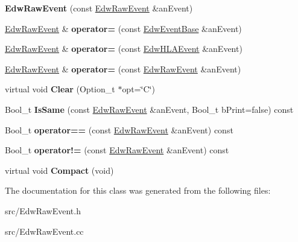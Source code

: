 \begin{DoxyCompactItemize}
\item 
\hypertarget{class_edw_raw_event_a6dc985ad21885b87dd63323aa3f976d9}{
{\bfseries EdwRawEvent} (const \hyperlink{class_edw_raw_event}{EdwRawEvent} \&anEvent)}
\label{class_edw_raw_event_a6dc985ad21885b87dd63323aa3f976d9}

\item 
\hypertarget{class_edw_raw_event_a9deee9051011719d5b54b9e8577bf076}{
\hyperlink{class_edw_raw_event}{EdwRawEvent} \& {\bfseries operator=} (const \hyperlink{class_edw_event_base}{EdwEventBase} \&anEvent)}
\label{class_edw_raw_event_a9deee9051011719d5b54b9e8577bf076}

\item 
\hypertarget{class_edw_raw_event_afc4b062e57612bb1a11b8c376416c143}{
\hyperlink{class_edw_raw_event}{EdwRawEvent} \& {\bfseries operator=} (const \hyperlink{class_edw_h_l_a_event}{EdwHLAEvent} \&anEvent)}
\label{class_edw_raw_event_afc4b062e57612bb1a11b8c376416c143}

\item 
\hypertarget{class_edw_raw_event_ac211cad9f007236a1f61ea7785884936}{
\hyperlink{class_edw_raw_event}{EdwRawEvent} \& {\bfseries operator=} (const \hyperlink{class_edw_raw_event}{EdwRawEvent} \&anEvent)}
\label{class_edw_raw_event_ac211cad9f007236a1f61ea7785884936}

\item 
\hypertarget{class_edw_raw_event_a67644a30d12355cf037f7ee13e271ea5}{
virtual void {\bfseries Clear} (Option\_\-t $\ast$opt=\char`\"{}C\char`\"{})}
\label{class_edw_raw_event_a67644a30d12355cf037f7ee13e271ea5}

\item 
\hypertarget{class_edw_raw_event_a1291b1ada8ad527048f8b13053507d54}{
Bool\_\-t {\bfseries IsSame} (const \hyperlink{class_edw_raw_event}{EdwRawEvent} \&anEvent, Bool\_\-t bPrint=false) const }
\label{class_edw_raw_event_a1291b1ada8ad527048f8b13053507d54}

\item 
\hypertarget{class_edw_raw_event_a22212a644931a9c28513ced326344d40}{
Bool\_\-t {\bfseries operator==} (const \hyperlink{class_edw_raw_event}{EdwRawEvent} \&anEvent) const }
\label{class_edw_raw_event_a22212a644931a9c28513ced326344d40}

\item 
\hypertarget{class_edw_raw_event_aa9385597e64e8c19e366043024458a0e}{
Bool\_\-t {\bfseries operator!=} (const \hyperlink{class_edw_raw_event}{EdwRawEvent} \&anEvent) const }
\label{class_edw_raw_event_aa9385597e64e8c19e366043024458a0e}

\item 
\hypertarget{class_edw_raw_event_ac52b4f653ec0a470adcb37bb469f84c0}{
virtual void {\bfseries Compact} (void)}
\label{class_edw_raw_event_ac52b4f653ec0a470adcb37bb469f84c0}

\end{DoxyCompactItemize}


The documentation for this class was generated from the following files:\begin{DoxyCompactItemize}
\item 
src/EdwRawEvent.h\item 
src/EdwRawEvent.cc\end{DoxyCompactItemize}
